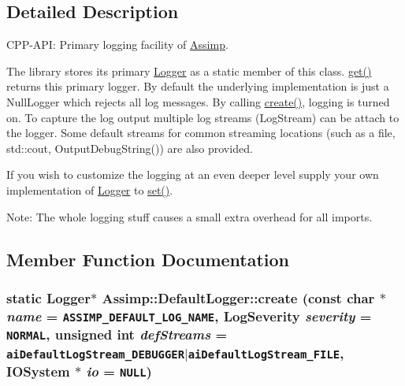 \subsection{Detailed Description}
CPP-API: Primary logging facility of \hyperlink{namespace_assimp}{Assimp}. 

The library stores its primary \hyperlink{class_assimp_1_1_logger_784e6d1a741072b17bab32a6a41055e8}{Logger} as a static member of this class. \hyperlink{class_assimp_1_1_default_logger_7d0a53f2db66945ade30094330a77ba4}{get()} returns this primary logger. By default the underlying implementation is just a NullLogger which rejects all log messages. By calling \hyperlink{class_assimp_1_1_default_logger_dccb11f85f8b0ef226c382e11ba665c3}{create()}, logging is turned on. To capture the log output multiple log streams (LogStream) can be attach to the logger. Some default streams for common streaming locations (such as a file, std::cout, OutputDebugString()) are also provided.

If you wish to customize the logging at an even deeper level supply your own implementation of \hyperlink{class_assimp_1_1_logger_784e6d1a741072b17bab32a6a41055e8}{Logger} to \hyperlink{class_assimp_1_1_default_logger_9daba548026045b99813c760c2842ed2}{set()}. \begin{Desc}
\item[Note:]The whole logging stuff causes a small extra overhead for all imports. \end{Desc}


\subsection{Member Function Documentation}
\hypertarget{class_assimp_1_1_default_logger_dccb11f85f8b0ef226c382e11ba665c3}{
\subsubsection[create]{\setlength{\rightskip}{0pt plus 5cm}static {\bf Logger}$\ast$ Assimp::DefaultLogger::create (const char $\ast$ {\em name} = {\tt ASSIMP\_\-DEFAULT\_\-LOG\_\-NAME}, \/  {\bf LogSeverity} {\em severity} = {\tt NORMAL}, \/  unsigned int {\em defStreams} = {\tt aiDefaultLogStream\_\-DEBUGGER$|$aiDefaultLogStream\_\-FILE}, \/  {\bf IOSystem} $\ast$ {\em io} = {\tt NULL})}}
\label{class_assimp_1_1_default_logger_dccb11f85f8b0ef226c382e11ba665c3}


